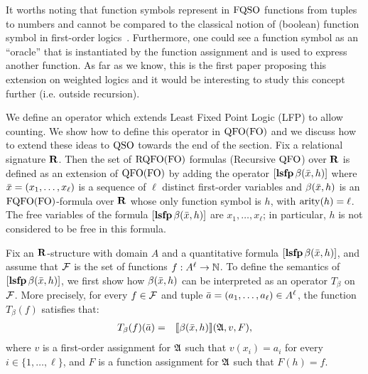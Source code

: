 It worths noting that function symbols represent in ${\rm FQSO}$ functions from tuples to numbers and cannot be compared to the classical notion of (boolean) function symbol in first-order logics~\cite{enderton2001mathematical}. 
Furthermore, one could see a function symbol as an ``oracle'' that is instantiated by the function assignment and is used to express another function. As far as we know, this is the first paper proposing this extension on weighted logics and it would be interesting to study this concept further (i.e. outside recursion).

We define an operator which extends Least Fixed Point Logic (LFP) \cite{I86,vardi1982complexity} to allow counting. 
We show how to define this operator in ${\rm QFO}({\rm FO})$ and we discuss how to extend these ideas to ${\rm QSO}$ towards the end of the section. 
Fix a relational signature $\mathbf{R}$. Then the set of ${\rm RQFO}({\rm FO})$ formulas (Recursive ${\rm QFO}$) over $\mathbf{R}$ is defined as an extension of ${\rm QFO}({\rm FO})$ by adding the operator $[{\bf lsfp} \, \beta(\bar{x}, h)]$ where $\bar{x} = (x_1, \ldots, x_\ell)$ is a sequence of $\ell$ distinct first-order variables and $\beta(\bar{x}, h)$ is an ${\rm FQFO}({\rm FO})$-formula over $\mathbf{R}$ whose only function symbol is $h$, with ${\rm arity}(h) = \ell$. The free variables of the formula $[{\bf lsfp} \, \beta(\bar{x},h)]$ are $x_1, \ldots, x_\ell$; in particular, $h$ is not considered to be free in this formula.

Fix an $\mathbf{R}$-structure with domain $A$ and a quantitative formula $[{\bf lsfp} \, \beta(\bar{x},h)]$, and assume that $\F$ is the set of functions $f :A^\ell \to \mathbb{N}$. To define the semantics of $[{\bf lsfp} \, \beta(\bar{x},h)]$, we first show how $\beta(\bar{x},h)$ can be interpreted as an operator $T_{\beta}$ on $\F$. More precisely, for every $f \in \F$ and tuple $\bar{a} = (a_1, \ldots, a_{\ell}) \in A^\ell$, the function $T_{\beta}(f)$ satisfies that:
\begin{eqnarray*}
T_{\beta}(f)(\bar{a}) & = & {\llbracket{}{\beta(\bar{x}, h)}\rrbracket}(\mathfrak{A},v,F),
\end{eqnarray*}
where $v$ is a first-order assignment  for $\mathfrak{A}$ such that $v(x_i) = a_i$ for every $i \in \{1, \ldots, \ell\}$, and $F$ is a function assignment for $\mathfrak{A}$ such that $F(h) = f$. 

